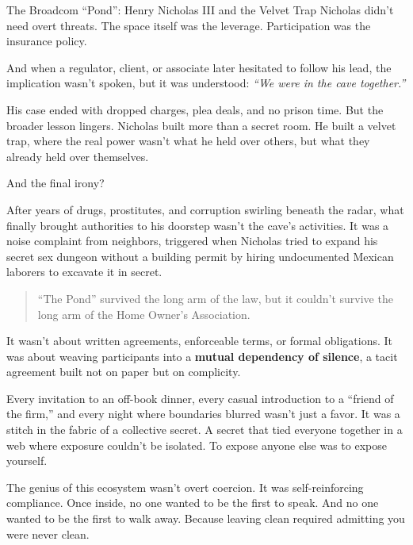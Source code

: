 \begin{HistoricalSidebar}{The Broadcom ``Pond'': Henry Nicholas III and the Velvet Trap}
  Nicholas didn’t need overt threats. The space itself was the leverage. Participation was the insurance policy.  

  \medskip
  
  And when a regulator, client, or associate later hesitated to follow his lead, the implication wasn’t spoken, but it 
  was understood:  \textit{“We were in the cave together.”}

  \medskip
  
  His case ended with dropped charges, plea deals, and no prison time. But the broader lesson lingers. Nicholas built 
  more than a secret room. He built a velvet trap, where the real power wasn’t what he held over others, but what they 
  already held over themselves.

  \medskip

  And the final irony?
  
  \medskip

  After years of drugs, prostitutes, and corruption swirling beneath the radar, what finally brought authorities to his 
  doorstep wasn’t the cave’s activities. It was a noise complaint from neighbors, triggered when Nicholas tried to expand 
  his secret sex dungeon without a building permit by hiring undocumented Mexican laborers to excavate it in secret.

  \begin{quote}
  ``The Pond'' survived the long arm of the law, but it couldn’t survive the long arm of the Home Owner's Association.
  \end{quote}

\end{HistoricalSidebar}

\medskip

It wasn’t about written agreements, enforceable terms, or formal obligations. It was about weaving participants into a 
\textbf{mutual dependency of silence}, a tacit agreement built not on paper but on complicity.

Every invitation to an off-book dinner, every casual introduction to a “friend of the firm,” and every night where boundaries 
blurred wasn’t just a favor. It was a stitch in the fabric of a collective secret. A secret that tied everyone 
together in a web where exposure couldn’t be isolated. To expose anyone else was to expose yourself.

The genius of this ecosystem wasn’t overt coercion. It was self-reinforcing compliance. Once inside, no one wanted to 
be the first to speak. And no one wanted to be the first to walk away. Because leaving clean required admitting you were 
never clean.


